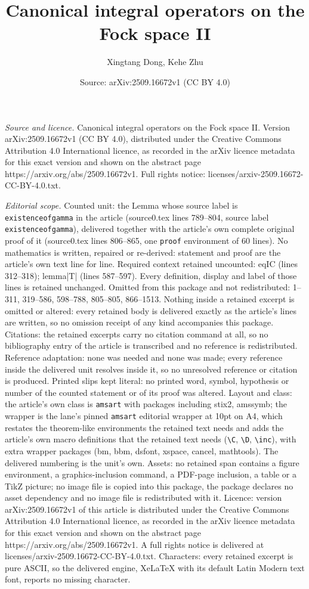 \documentclass[10pt,a4paper]{amsart}
\title[Canonical integral operators on the Fock space II]{Canonical integral operators on the Fock space II}
\author{Xingtang Dong, Kehe Zhu}
\date{Source: arXiv:2509.16672v1 (CC BY 4.0)}
\begin{document}
\maketitle

\noindent\emph{Source and licence.} Canonical integral operators on the Fock space II. Version arXiv:2509.16672v1 (CC BY 4.0), distributed under the Creative Commons Attribution 4.0 International licence, as recorded in the arXiv licence metadata for this exact version and shown on the abstract page https://arxiv.org/abs/2509.16672v1. Full rights notice: licenses/arxiv-2509.16672-CC-BY-4.0.txt.\par\smallskip

\noindent\textit{Editorial scope.} Counted unit: the Lemma whose source label is \texttt{existenceofgamma} in the article (source0.tex lines 789--804, source label \texttt{existenceofgamma}), delivered together with the article's own complete original proof of it (source0.tex lines 806--865, one \texttt{proof} environment of 60 lines). No mathematics is written, repaired or re-derived: statement and proof are the article's own text line for line. Required context retained uncounted: eqIC (lines 312--318); lemma|T| (lines 587--597). Every definition, display and label of those lines is retained unchanged. Omitted from this package and not redistributed: 1--311, 319--586, 598--788, 805--805, 866--1513. Nothing inside a retained excerpt is omitted or altered: every retained body is delivered exactly as the article's lines are written, so no omission receipt of any kind accompanies this package. Citations: the retained excerpts carry no citation command at all, so no bibliography entry of the article is transcribed and no reference is redistributed. Reference adaptation: none was needed and none was made; every reference inside the delivered unit resolves inside it, so no unresolved reference or citation is produced. Printed slips kept literal: no printed word, symbol, hypothesis or number of the counted statement or of its proof was altered. Layout and class: the article's own class is \texttt{amsart} with packages including stix2, amssymb; the wrapper is the lane's pinned \texttt{amsart} editorial wrapper at 10pt on A4, which restates the theorem-like environments the retained text needs and adds the article's own macro definitions that the retained text needs (\texttt{\textbackslash C}, \texttt{\textbackslash D}, \texttt{\textbackslash inc}), with extra wrapper packages (bm, bbm, dsfont, xspace, cancel, mathtools). The delivered numbering is the unit's own. Assets: no retained span contains a figure environment, a graphics-inclusion command, a PDF-page inclusion, a table or a TikZ picture; no image file is copied into this package, the package declares no asset dependency and no image file is redistributed with it. Licence: version arXiv:2509.16672v1 of this article is distributed under the Creative Commons Attribution 4.0 International licence, as recorded in the arXiv licence metadata for this exact version and shown on the abstract page https://arxiv.org/abs/2509.16672v1. A full rights notice is delivered at licenses/arxiv-2509.16672-CC-BY-4.0.txt. Characters: every retained excerpt is pure ASCII, so the delivered engine, XeLaTeX with its default Latin Modern text font, reports no missing character.
\end{document}
